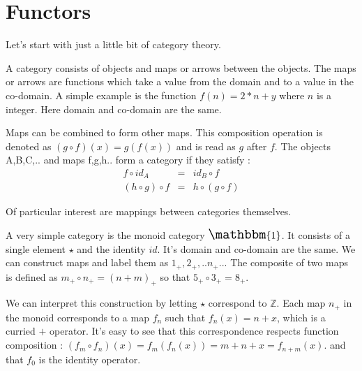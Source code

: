 \documentclass[12pt,fleqn]{article}
\begin{document}
\begin{comment}
C++ does not provide a curry operator and functions are not written in curried form. 
Compare this to Haskell where functions are curried by default \cite{lipovaca, hutton}.
However writing a curry operator or writing curried versions of a function has become a lot easier now that lambda's are supported.

\end{comment}

\section*{Functors}

Let's start with just a little bit of category theory.

A category consists of objects and maps or arrows between the objects.
The maps or arrows are functions which take a value from the domain and to a value in the co-domain. A simple example is the function $f(n) = 2*n + y$ 
where $n$ is a integer. Here domain and co-domain are the same.

Maps can be combined to form other maps.
This composition operation is denoted as $(g \circ f)(x) = g(f(x))$ and is read as $g$ after $f$.
The  objects A,B,C,.. and maps f,g,h.. form a category if they satisfy :
\begin{eqnarray*}
f \circ id_{A} &=& id_{B} \circ f \\
(h \circ g) \circ f &=& h \circ (g \circ f)
\end{eqnarray*}

Of particular interest are mappings between categories themselves.

A very simple category is the monoid category $\Large \mathbbm{1}$.
It consists of a single element $\star$ and the identity $id$.
It's domain and co-domain are the same.
We can construct maps and label them as $1_+, 2_+,..n_+..$.
The composite of two maps is defined as $m_+ \circ n_+ = (n+m)_+$ so that $5_+ \circ 3_+ = 8_+$.

We can interpret this construction by letting $\star$ correspond to $\mathbb{Z}$.
Each map $n_+$ in the monoid corresponds to a map $f_n$ such that $f_{n}(x) = n + x$, which is a curried $+$ operator. 
It's easy to see that this correspondence respects function composition : $(f_m \circ f_n) (x) = f_m(f_n(x)) = m + n + x = f_{n+m}(x)$.
and that $f_0$ is the identity operator.
\end{document}
